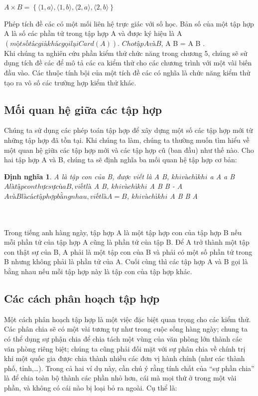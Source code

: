 \documentclass[11pt,a4paper,oneside]{article}
\newtheorem{modeling_def}{Định nghĩa }
\begin{document}
\begin{center}
$A \times B = \left\{\langle 1, a \rangle , \langle 1, b \rangle , \langle 2, a \rangle , \langle 2, b \rangle \right\}$
\end{center}
\newline
Phép tích đề các có một mối liên hệ trực giác với số học. Bản số của một tập hợp A là số các phần tử trong tập hợp A và được ký hiệu là \lvert A \rvert $ (một số tác giả khác gọi lại Card(A)).$  $Cho tập A và B$, \lvert A \times B \rvert = \lvert A \rvert \times \lvert B \rvert. \\

Khi chúng ta nghiên cứu phần kiểm thử chức năng trong chương 5, chúng sẽ sử dụng tích đề các để mô tả các ca kiểm thử cho các chương trình với một vài biến đầu vào. Các thuộc tính bội của một tích đề các có nghĩa là chức năng kiểm thử tạo ra vô số các trường hợp kiểm thử khác.

\subsection {Mối quan hệ giữa các tập hợp}
Chúng ta sử dụng các phép toán tập hợp để xây dựng một số các tập hợp mới từ những tập hợp đã tồn tại. Khi chúng ta làm, chúng ta thường muốn tìm hiểu về một quan hệ giữa các tập hợp mới và các tập hợp cũ (ban đầu) như thế nào. Cho hai tập hợp A và B, chúng ta sẽ định nghĩa ba mối quan hệ tập hợp cơ bản:

\begin{modeling_def}
A là tập con của B, được viết là A \subseteq B, $ khi và chỉ khi $ a \in A \Rightarrow a \in B
$ A là tập con thực sự của B, viết là $ A \subset B, $ khi và chỉ khi $ A \subseteq B \land B - A \neq {\O}\\
$A và B là các tập hợp bằng nhau, viết là A = B$, $ khi và chỉ khi $ A \subseteq B \land B \subseteq A
\end{modeling_def}
\\
\\
Trong tiếng anh hàng ngày, tập hợp A là một tập hợp con của tập hợp B nếu mỗi phần tử của tập hợp A cũng là phần tử của tập B. Để A trở thành một tập con thật sự của B, A phải là một tập con của B và phải có một số phần tử trong B nhưng không phải là phần tử của A. Cuối cùng thì các tập hợp A và B gọi là bằng nhau nếu mỗi tập hợp này là tập con của tập hợp khác.

\subsection {Các cách phân hoạch tập hợp}
Một cách phân hoạch tập hợp là một việc đặc biệt quan trọng cho các kiểm thử. Các phân chia sẽ có một vài tương tự như trong cuộc sống hàng ngày; chung ta có thể dụng sự phận chia để chia tách một vùng của văn phòng lớn thành các văn phòng riêng biệt; chúng ta cũng phải đối mặt với sự phân chia về chính trị khi một quốc gia được chia thành nhiều các đơn vị hành chính (như các thành phố, tỉnh,\dots). Trong cả hai ví dụ này, cần chú ý rằng tính chất của “sự phần chia” là để chia toàn bộ thành các phần nhỏ hơn, cái mà mọi thứ ở trong một vài phần, và không có cái nào bị loại bỏ ra ngoài. Cụ thể là:
\end{document}
